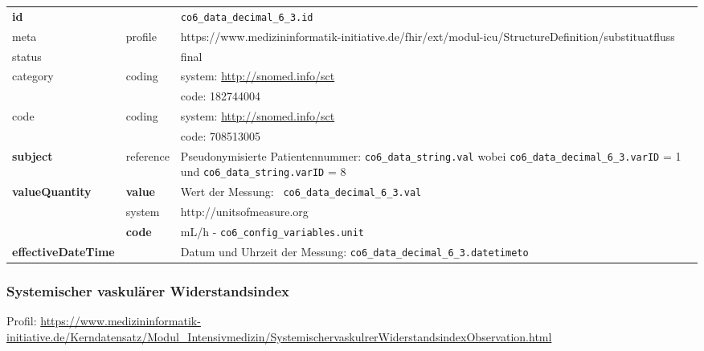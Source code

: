 \clearpage

\begin{longtable}{|l|l|p{7.5cm}|}
        \hline
        \rowcolor{lightgray} \multicolumn{3}{|l|}{Data Mapping (inhaltlich)} \\ \hline
        \textbf{id} &  & \texttt{co6\_data\_decimal\_6\_3.id} \\ \hline
	meta & profile & https://www.medizininformatik-initiative.de/fhir/ext/modul-icu/StructureDefinition/substituatfluss \\ \hline 
	status &  & final   \\ \hline 
	category & coding & system: \url{http://snomed.info/sct} \\
\cline{3-3}
	& & code: 182744004 \\ \hline
	code & coding & system: \url{http://snomed.info/sct} \\ 
	\cline{3-3} 
	&  & code: 708513005 \\ \hline
	 \textbf{subject} & reference & Pseudonymisierte Patientennummer: \texttt{co6\_data\_string.val} wobei \texttt{co6\_data\_decimal\_6\_3.varID} = 1 und \texttt{co6\_data\_string.varID} = 8 \\ \hline
	 \textbf{valueQuantity}  & \textbf{value} & Wert der Messung: \texttt{
co6\_data\_decimal\_6\_3.val} \\
        \cline{2-3}
         & system & http://unitsofmeasure.org \\
         \cline{2-3}
         & \textbf{code} & mL/h - \texttt{co6\_config\_variables.unit} \\ \hline
     \textbf{effectiveDateTime}  & & Datum und Uhrzeit der Messung: \texttt{co6\_data\_decimal\_6\_3.datetimeto} \\ \hline
\end{longtable}

\subsubsection{Systemischer vaskulärer Widerstandsindex} 
Profil: \url{https://www.medizininformatik-initiative.de/Kerndatensatz/Modul_Intensivmedizin/SystemischervaskulrerWiderstandsindexObservation.html}

